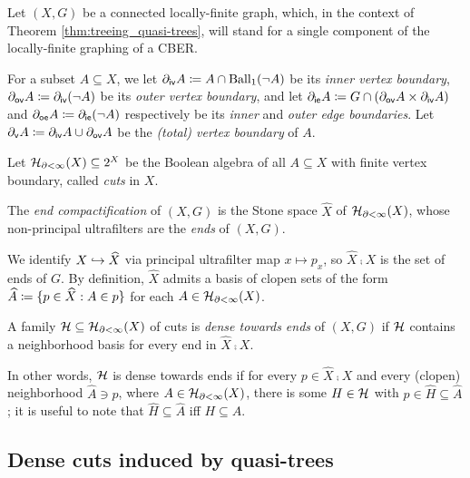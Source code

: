 \documentclass{amsart}
\begin{document}
    Let $(X,G)$ be a connected locally-finite graph, which, in the context of Theorem \ref{thm:treeing_quasi-trees}, will stand for a single component of the locally-finite graphing of a CBER.

    \begin{definition}
        For a subset $A\subseteq X$, we let $\partial_{\textsf{iv}}A\coloneqq A\cap\operatorname{Ball}_1(\lnot A)$ be its \textit{inner vertex boundary}, $\partial_{\textsf{ov}}A\coloneqq\partial_{\textsf{iv}}(\lnot A)$ be its \textit{outer vertex boundary}, and let $\partial_{\textsf{ie}}A\coloneqq G\cap(\partial_{\textsf{ov}}A\times\partial_{\textsf{iv}}A)$ and $\partial_{\textsf{oe}}A\coloneqq\partial_{\textsf{ie}}(\lnot A)$ respectively be its \textit{inner} and \textit{outer edge boundaries}. Let $\partial_{\textsf{v}}A\coloneqq\partial_{\textsf{iv}}A\cup\partial_{\textsf{ov}}A$ be the \textit{(total) vertex boundary} of $A$.
    \end{definition}

    Let $\mathcal{H}_{\partial<\infty}(X)\subseteq2^X$ be the Boolean algebra of all $A\subseteq X$ with finite vertex boundary, called \textit{cuts} in $X$.

    \begin{definition}
        The \textit{end compactification} of $(X,G)$ is the Stone space $\widehat{X}$ of $\mathcal{H}_{\partial<\infty}(X)$, whose non-principal ultrafilters are the \textit{ends} of $(X,G)$.
    \end{definition}

    We identify $X\hookrightarrow\widehat{X}$ via principal ultrafilter map $x\mapsto p_x$, so $\widehat{X}\comp X$ is the set of ends of $G$. By definition, $\widehat{X}$ admits a basis of clopen sets of the form $\widehat{A}\coloneqq\{p\in\widehat{X}: A\in p\}$ for each $A\in\mathcal{H}_{\partial<\infty}(X)$.

    \begin{definition}
        A family $\mathcal{H}\subseteq\mathcal{H}_{\partial<\infty}(X)$ of cuts is \textit{dense towards ends} of $(X,G)$ if $\mathcal{H}$ contains a neighborhood basis for every end in $\widehat{X}\comp X$.

        In other words, $\mathcal{H}$ is dense towards ends if for every $p\in\widehat{X}\comp X$ and every (clopen) neighborhood $\widehat{A}\ni p$, where $A\in\mathcal{H}_{\partial<\infty}(X)$, there is some $H\in\mathcal{H}$ with $p\in\widehat{H}\subseteq\widehat{A}$; it is useful to note that $\widehat{H}\subseteq\widehat{A}$ iff $H\subseteq A$.
    \end{definition}

    \subsection{Dense cuts induced by quasi-trees}\label{sec:dense_cuts_induced_by_quasi-trees}
\end{document}
